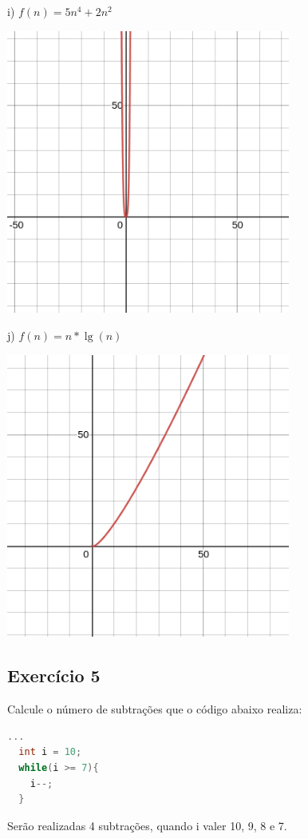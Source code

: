 \documentclass[12pt]{article}
\begin{document}
  i) $f(n) = 5n^{4} + 2n^{2}$
  \begin{center}
    \includegraphics[width=0.7\textwidth]{graphics/i.png}\\
  \end{center}
  j) $f(n) = n * \lg{(n)}$
  \begin{center}
    \includegraphics[width=0.7\textwidth]{graphics/j.png}\\
\end{center}


\subsection{Exercício 5}
Calcule o número de subtrações que o código abaixo realiza:
\begin{lstlisting}[language=C]
  ...
  int i = 10;
  while(i >= 7){
    i--;
  }
\end{lstlisting}
Serão realizadas 4 subtrações, quando i valer 10, 9, 8 e 7.
\end{document}
